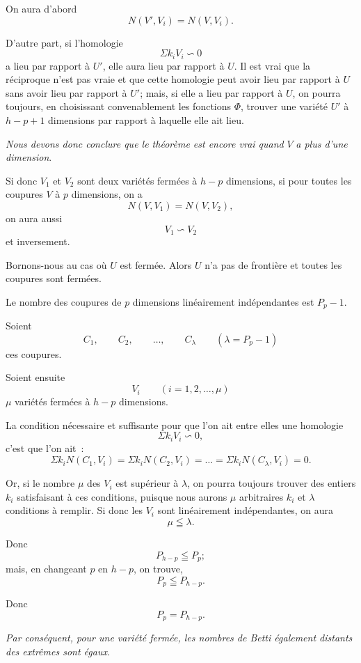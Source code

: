 \documentclass{article}
\begin{document}
On aura d'abord
\[
N(V', V_{i}) = N(V, V_{i}).
\]

D'autre part, si l'homologie
\[
\Sigma k_{i}V_{i} \backsim 0
\]
a lieu par rapport à $U'$, elle aura lieu par rapport à $U$. Il est vrai que la réciproque n'est pas vraie et que cette homologie peut avoir lieu par rapport à $U$ sans avoir lieu par rapport à $U'$; mais, si elle a lieu par rapport à $U$, on pourra toujours, en choisissant convenablement les fonctions $\Phi$, trouver une variété $U'$ à $h-p+1$ dimensions par rapport à laquelle elle ait lieu.

\emph{Nous devons donc conclure que le théorème est encore vrai quand} $V$ \emph{a plus d'une dimension}.

Si donc $V_{1}$ et $V_{2}$ sont deux variétés fermées à $h-p$ dimensions, si pour toutes les coupures $V$ à $p$ dimensions, on a
\[
N(V, V_{1}) = N(V, V_{2}),
\]
on aura aussi
\[
V_{1} \backsim V_{2}
\]
et inversement.

Bornons-nous au cas où $U$ est fermée. Alors $U$ n'a pas de frontière et toutes les coupures sont fermées.

Le nombre des coupures de $p$ dimensions linéairement indépendantes est $P_{p} - 1$.

Soient
\[
C_{1}, \qquad C_{2}, \qquad \ldots, \qquad C_{\lambda} \qquad (\lambda = P_{p} - 1)
\]
ces coupures.

Soient ensuite
\[
V_{i} \qquad (i = 1, 2, \ldots, \mu)
\]
$\mu$ variétés fermées à $h-p$ dimensions.

La condition nécessaire et suffisante pour que l'on ait entre elles une homologie
\[
\Sigma k_{i}V_{i} \backsim 0,
\]
c'est que l'on ait~:
\[
\Sigma k_{i}N(C_{1}, V_{i}) = \Sigma k_{i}N(C_{2}, V_{i}) = \ldots = \Sigma k_{i}N(C_{\lambda}, V_{i}) = 0.
\]

Or, si le nombre $\mu$ des $V_{i}$ est supérieur à $\lambda$, on pourra toujours trouver des entiers $k_{i}$ satisfaisant à ces conditions, puisque nous aurons $\mu$ arbitraires $k_{i}$ et $\lambda$ conditions à remplir. Si donc les $V_{i}$ sont linéairement indépendantes, on aura
\[
\mu \leqq \lambda.
\]

Donc
\[
P_{h-p} \leqq P_{p};
\]
mais, en changeant $p$ en $h-p$, on trouve,
\[
P_{p} \leqq P_{h-p}.
\]

Donc
\[
P_{p} = P_{h-p}.
\]

\emph{Par conséquent, pour une variété fermée, les nombres de Betti également distants des extrêmes sont égaux}.
\end{document}
